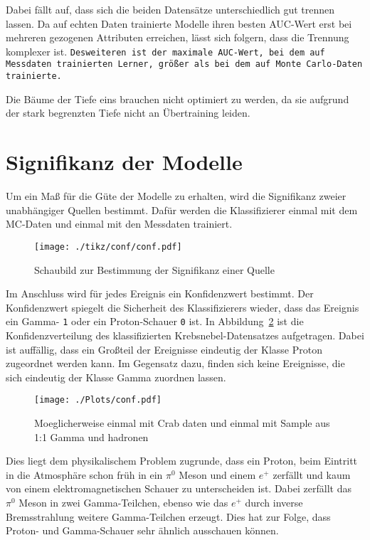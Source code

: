 Dabei fällt auf, dass sich die beiden Datensätze unterschiedlich gut trennen lassen.
Da auf echten Daten trainierte Modelle ihren besten AUC-Wert erst bei mehreren gezogenen Attributen erreichen, lässt sich folgern, dass die Trennung komplexer ist.
\texttt{Desweiteren ist der maximale AUC-Wert, bei dem auf Messdaten trainierten Lerner, größer als bei dem auf Monte Carlo-Daten trainierte.} 

Die Bäume der Tiefe eins brauchen nicht optimiert zu werden, da sie aufgrund der stark begrenzten Tiefe nicht an Übertraining leiden.

\section{Signifikanz der Modelle}
Um ein Maß für die Güte der Modelle zu erhalten, wird die Signifikanz zweier unabhängiger Quellen bestimmt. 
Dafür werden die Klassifizierer einmal mit dem MC-Daten und einmal mit den Messdaten trainiert. 
\begin{figure}[H]
  \centering
  \texttt{[image: ./tikz/conf/conf.pdf]}
  \caption{Schaubild zur Bestimmung der Signifikanz einer Quelle}
  \label{fig:<+label+>}
\end{figure}
Im Anschluss wird für jedes Ereignis ein Konfidenzwert bestimmt. 
Der Konfidenzwert spiegelt die Sicherheit des Klassifizierers wieder, dass das Ereignis ein Gamma- \texttt{1} oder ein Proton-Schauer \texttt{0} ist. 
In Abbildung~\ref{fig:confdist} ist die Konfidenzverteilung des klassifizierten Krebsnebel-Datensatzes aufgetragen. 
Dabei ist auffällig, dass ein Großteil der Ereignisse eindeutig der Klasse Proton zugeordnet werden kann. 
Im Gegensatz dazu, finden sich keine Ereignisse, die sich eindeutig der Klasse Gamma zuordnen lassen.
\begin{figure}[H]
  \centering
  \texttt{[image: ./Plots/conf.pdf]}
  \caption{Moeglicherweise einmal mit Crab daten und einmal mit Sample aus 1:1 Gamma und hadronen}
  \label{fig:confdist}
\end{figure}
Dies liegt dem physikalischem Problem zugrunde, dass ein Proton, beim Eintritt in die Atmosphäre schon früh in ein $\pi^{0}$ Meson und einem $e^{+}$ zerfällt und kaum von einem elektromagnetischen Schauer zu unterscheiden ist.
Dabei zerfällt das $\pi^{0}$ Meson in zwei Gamma-Teilchen, ebenso wie das $e^{+}$ durch inverse Bremsstrahlung weitere Gamma-Teilchen erzeugt. 
Dies hat zur Folge, dass Proton- und Gamma-Schauer sehr ähnlich ausschauen können.
